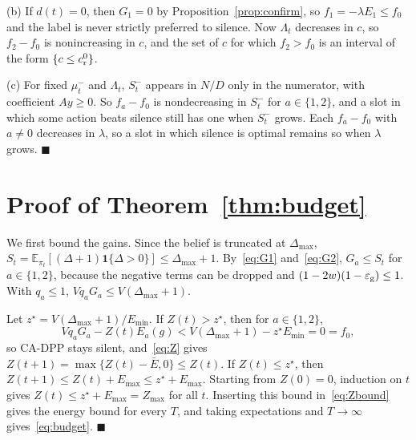 \documentclass[journal]{IEEEtran}
\theoremstyle{remark}
\newcommand{\E}{\mathbb{E}}
\newcommand{\ind}[1]{\mathbf{1}\{#1\}}
\newcommand{\ee}{\varepsilon}
\begin{document}
(b) If $d(t)=0$, then $G_1=0$ by Proposition~\ref{prop:confirm}, so $f_1=-\lambda E_1\le f_0$ and the label is never strictly preferred to silence. Now $\Lambda_t$ decreases in $c$, so $f_2-f_0$ is nonincreasing in $c$, and the set of $c$ for which $f_2>f_0$ is an interval of the form $\{c\le c^0_{\rm r}\}$.

(c) For fixed $\mu^-_t$ and $\Lambda_t$, $S^-_t$ appears in $N/D$ only in the numerator, with coefficient $Ay\ge0$. So $f_a-f_0$ is nondecreasing in $S^-_t$ for $a\in\{1,2\}$, and a slot in which some action beats silence still has one when $S^-_t$ grows. Each $f_a-f_0$ with $a\neq0$ decreases in $\lambda$, so a slot in which silence is optimal remains so when $\lambda$ grows. \hfill$\blacksquare$

\section{Proof of Theorem~\ref{thm:budget}}\label{app:budget}
We first bound the gains. Since the belief is truncated at $\Delta_{\max}$, $S_t=\E_{\pi_t}[(\Delta+1)\ind{\Delta>0}]\le\Delta_{\max}+1$. By~\eqref{eq:G1} and~\eqref{eq:G2}, $G_a\le S_t$ for $a\in\{1,2\}$, because the negative terms can be dropped and $(1-2w)(1-\ee_{\rm g})\le1$. With $q_a\le1$, $Vq_aG_a\le V(\Delta_{\max}+1)$.

Let $z^\star=V(\Delta_{\max}+1)/E_{\min}$. If $Z(t)>z^\star$, then for $a\in\{1,2\}$,
\[
Vq_aG_a-Z(t)E_a(g)<V(\Delta_{\max}+1)-z^\star E_{\min}=0=f_0,
\]
so CA-DPP stays silent, and~\eqref{eq:Z} gives $Z(t+1)=\max\{Z(t)-\bar E,0\}\le Z(t)$. If $Z(t)\le z^\star$, then $Z(t+1)\le Z(t)+E_{\max}\le z^\star+E_{\max}$. Starting from $Z(0)=0$, induction on $t$ gives $Z(t)\le z^\star+E_{\max}=Z_{\max}$ for all $t$. Inserting this bound in~\eqref{eq:Zbound} gives the energy bound for every $T$, and taking expectations and $T\to\infty$ gives~\eqref{eq:budget}. \hfill$\blacksquare$



\end{document}

